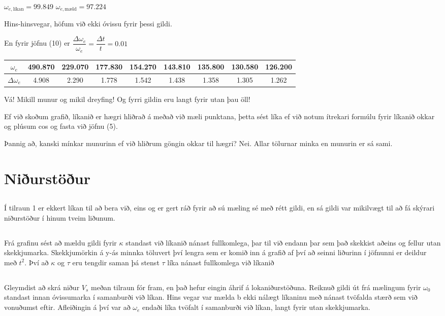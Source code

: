 \documentclass[12pt]{article}
\begin{document}
$\omega_{e,\text{líkan}} = 99.849$
\qquad
$\omega_{e,\text{mæld}} = 97.224$

Hins-hinsvegar, höfum við ekki óvissu fyrir þessi gildi.

En fyrir jöfnu (10) er $\dfrac{\Delta \omega_e}{\omega_e} = \dfrac{\Delta t}{t} = 0.01$


\begin{table}[H]
    \begin{tabular}{|c|c|c|c|c|c|c|c|c|}
		$ \omega_e $ & 490.870 & 229.070 & 177.830 & 154.270 & 143.810 & 135.800 & 130.580 & 126.200  \\
		\hline
		$\Delta \omega_e$ &	4.908 & 2.290 & 1.778 & 1.542 & 1.438 & 1.358 & 1.305 & 1.262  \\
    \end{tabular}
\end{table}

Vá! Mikill munur og mikil dreyfing! 
Og fyrri gildin eru langt fyrir utan þau öll!

Ef við skoðum grafið, líkanið er hægri hliðrað á meðað við mæli punktana, þetta sést líka ef við notum ítrekari formúlu fyrir líkanið okkar og plúsum cos og fasta við jöfnu (5). 

Þannig að, kanski mínkar munurinn ef við hliðrum göngin okkar til hægri? Nei. Allar tölurnar minka en munurin er sá sami.

\section{Niðurstöður}

\subsection{}
Í tilraun 1 er ekkert líkan til að bera við, eins og er gert ráð fyrir að sú mæling sé með rétt gildi, 
en sá gildi var mikilvægt til að fá skýrari niðurstöður í hinum tveim liðunum.

\subsection{}
Frá grafinu sést að mældu gildi fyrir $ \kappa $ standast við líkanið nánast fullkomlega, þar til við endann þar
sem það skekkist aðeins og fellur utan skekkjumarka. Skekkjumörkin á y-ás minnka töluvert því lengra sem er 
komið inn á grafið af því að seinni liðurinn í jöfnunni er deildur með $ t^2 $. Því að $ \kappa $ og $ \tau $ eru
tengdir saman þá stenst $ \tau $ líka nánast fullkomlega við líkanið

\subsection{}
Gleymdist að skrá niður $ V_s $ meðan tilraun fór fram, en það hefur eingin áhrif á lokaniðurstöðuna. 
Reiknuð gildi út frá mælingum fyrir $\omega_0$ standast innan óvissumarka í samanburði við líkan. 
Hins vegar var mælda b ekki nálægt líkaninu með nánast tvöfalda stærð sem við vonuðumst eftir.
Afleiðingin á því var að $\omega_e$ endaði líka tvöfalt í samanburði við líkan, langt fyrir utan skekkjumarka. 
\end{document}
